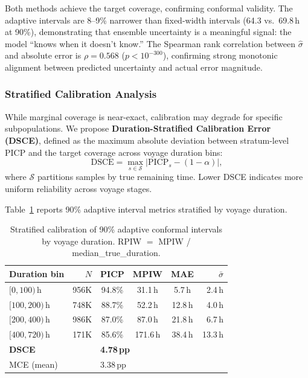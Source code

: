 \documentclass[conference]{IEEEtran}
\begin{document}
Both methods achieve the target coverage, confirming conformal validity.
The adaptive intervals are 8--9\% narrower than fixed-width intervals (64.3 vs.\ 69.8\,h at 90\%), demonstrating that ensemble uncertainty is a meaningful signal: the model ``knows when it doesn't know.''
The Spearman rank correlation between $\hat{\sigma}$ and absolute error is $\rho = 0.568$ ($p < 10^{-300}$), confirming strong monotonic alignment between predicted uncertainty and actual error magnitude.

\subsubsection{Stratified Calibration Analysis}

While marginal coverage is near-exact, calibration may degrade for specific subpopulations.
We propose \textbf{Duration-Stratified Calibration Error (DSCE)}, defined as the maximum absolute deviation between stratum-level PICP and the target coverage across voyage duration bins:
\begin{equation}
    \text{DSCE} = \max_{s \in \mathcal{S}} \bigl|\text{PICP}_s - (1{-}\alpha)\bigr|,
\end{equation}
where $\mathcal{S}$ partitions samples by true remaining time.
Lower DSCE indicates more uniform reliability across voyage stages.

Table~\ref{tab:stratified_calib} reports 90\% adaptive interval metrics stratified by voyage duration.

\begin{table}[t]
    \centering
    \caption{Stratified calibration of 90\% adaptive conformal intervals by voyage duration. RPIW $=$ MPIW / median\_true\_duration.}
    \label{tab:stratified_calib}
    \footnotesize
    \begin{tabular}{lrcccr}
        \toprule
        \textbf{Duration bin} & \textbf{$N$} & \textbf{PICP} & \textbf{MPIW} & \textbf{MAE} & $\bar{\sigma}$ \\
        \midrule
        $[0, 100)$\,h   & 956K  & 94.8\% & 31.1\,h  & 5.7\,h  & 2.4\,h \\
        $[100, 200)$\,h  & 748K  & 88.7\% & 52.2\,h  & 12.8\,h & 4.0\,h \\
        $[200, 400)$\,h  & 986K  & 87.0\% & 87.0\,h  & 21.8\,h & 6.7\,h \\
        $[400, 720)$\,h  & 171K  & 85.6\% & 171.6\,h & 38.4\,h & 13.3\,h \\
        \midrule
        \multicolumn{2}{l}{\textbf{DSCE}} & \multicolumn{4}{l}{\textbf{4.78\,pp}} \\
        \multicolumn{2}{l}{MCE (mean)} & \multicolumn{4}{l}{3.38\,pp} \\
        \bottomrule
    \end{tabular}
\end{table}
\end{document}
